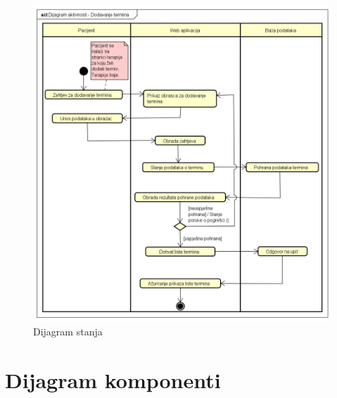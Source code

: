 \begin{figure}[H]
				\includegraphics[scale=0.3]{slike/Dijagram_aktivnosti_Dodavanje_termina.PNG} %
				\centering
				\caption{Dijagram stanja}
				\label{fig:dijagram_aktivnosti_termin}
			\end{figure}
			
			\eject
		\section{Dijagram komponenti}
		
